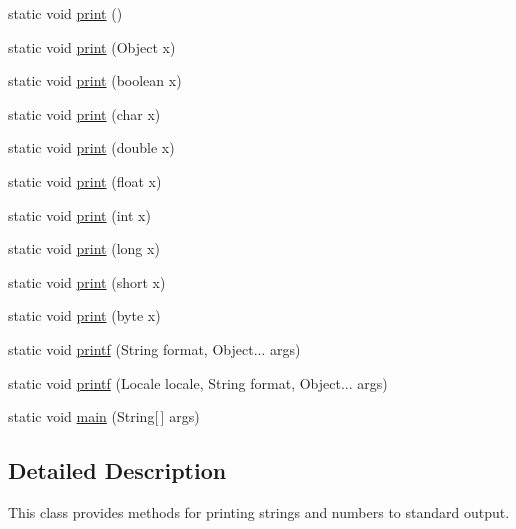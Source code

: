 \begin{DoxyCompactItemize}
\item 
static void \hyperlink{classcom_1_1mycompany_1_1myfirstmapboxapp_1_1_std_out_abbf312d71a948d2138bfaabc0ac044ce}{print} ()
\item 
static void \hyperlink{classcom_1_1mycompany_1_1myfirstmapboxapp_1_1_std_out_ac8389d13b46e8edc312c147929d3b934}{print} (Object x)
\item 
static void \hyperlink{classcom_1_1mycompany_1_1myfirstmapboxapp_1_1_std_out_ab09e01125c6d2a478e20f558372a6325}{print} (boolean x)
\item 
static void \hyperlink{classcom_1_1mycompany_1_1myfirstmapboxapp_1_1_std_out_ae7a0beff9d42a5d57664312bdd3870bf}{print} (char x)
\item 
static void \hyperlink{classcom_1_1mycompany_1_1myfirstmapboxapp_1_1_std_out_a6386ccdca565c0b2fbfe4f88cff27696}{print} (double x)
\item 
static void \hyperlink{classcom_1_1mycompany_1_1myfirstmapboxapp_1_1_std_out_a73dfd4542e29d8fc61b3df443f2a84a0}{print} (float x)
\item 
static void \hyperlink{classcom_1_1mycompany_1_1myfirstmapboxapp_1_1_std_out_ad62f40ef8de5d9134ea0dd1b093eb41b}{print} (int x)
\item 
static void \hyperlink{classcom_1_1mycompany_1_1myfirstmapboxapp_1_1_std_out_a7e28cde42fe1e73a31752e8770ea5164}{print} (long x)
\item 
static void \hyperlink{classcom_1_1mycompany_1_1myfirstmapboxapp_1_1_std_out_ac02193dbe968144eafac24e687a28600}{print} (short x)
\item 
static void \hyperlink{classcom_1_1mycompany_1_1myfirstmapboxapp_1_1_std_out_a3c3ae9bfc3b3c105f9fc166c17b080ee}{print} (byte x)
\item 
static void \hyperlink{classcom_1_1mycompany_1_1myfirstmapboxapp_1_1_std_out_a8c2a2831b1ce62a571515806ec4603b1}{printf} (String format, Object... args)
\item 
static void \hyperlink{classcom_1_1mycompany_1_1myfirstmapboxapp_1_1_std_out_a14de43bb30dfdedb9e694aa3bd5d39e9}{printf} (Locale locale, String format, Object... args)
\item 
static void \hyperlink{classcom_1_1mycompany_1_1myfirstmapboxapp_1_1_std_out_a8ce973bcd3142601f1deeb0cb867a4e7}{main} (String\mbox{[}$\,$\mbox{]} args)
\end{DoxyCompactItemize}


\subsection{Detailed Description}
This class provides methods for printing strings and numbers to standard output. 


